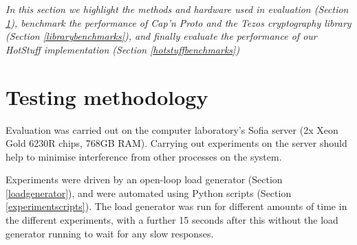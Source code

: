 



\textit{In this section we highlight the methods and hardware used in evaluation (Section \ref{testingmethods}), benchmark the performance of Cap'n Proto and the Tezos cryptography library (Section \ref{librarybenchmarks}), and finally evaluate the performance of our HotStuff implementation (Section \ref{hotstuffbenchmarks})}

\section{Testing methodology} \label{testingmethods}
Evaluation was carried out on the computer laboratory's Sofia server (2x Xeon Gold 6230R chips, 768GB RAM). Carrying out experiments on the server should help to minimise interference from other processes on the system.

Experiments were driven by an open-loop load generator (Section \ref{loadgenerator}), and were automated using Python scripts (Section \ref{experimentscripts}). The load generator was run for different amounts of time in the different experiments, with a further 15 seconds after this without the load generator running to wait for any slow responses.

